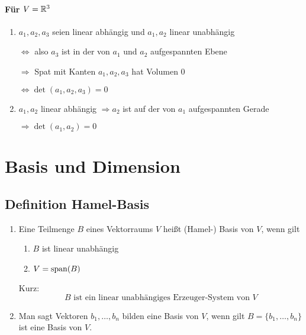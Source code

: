 \paragraph{Für $V = \mathbb{R}^3$}
\begin{enumerate}[label= (\alph*)]
    \item $a_1, a_2, a_3$ seien linear abhängig und $a_1, a_2$ linear unabhängig

        $\Leftrightarrow$ also $a_3$ ist in der von $a_1$ und $a_2$ aufgespannten
        Ebene

        $\Rightarrow$ Spat mit Kanten $a_1, a_2, a_3$ hat Volumen $0$

        $\Leftrightarrow \det(a_1, a_2, a_3) = 0$
    \item $a_1, a_2$ linear abhängig $\Rightarrow a_2$ ist auf der von $a_1$
        aufgespannten Gerade

        $\Rightarrow \det(a_1, a_2) = 0$
\end{enumerate}

\section{Basis und Dimension}
\subsection{Definition Hamel-Basis}
\begin{enumerate}[label= (\alph*)]
    \item Eine Teilmenge $B$ eines Vektorraums $V$ heißt (Hamel-) Basis von $V$,
        wenn gilt
        \begin{enumerate}[label= (\roman*)]
            \item $B$ ist linear unabhängig
            \item $V = \operatorname{span}(B)$
        \end{enumerate}
        Kurz:
        \begin{equation*}
            B \text{ ist ein linear unabhängiges Erzeuger-System
            von }V
        \end{equation*}
    \item Man sagt Vektoren $b_1, \ldots, b_n$ bilden eine Basis von $V$, wenn
        gilt $B=\{b_1, \ldots, b_n\}$ ist eine Basis von $V$.
\end{enumerate}

